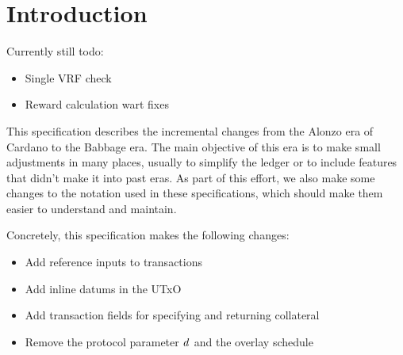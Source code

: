\section{Introduction}

Currently still todo:

\begin{itemize}
\item Single VRF check
\item Reward calculation wart fixes
\end{itemize}

This specification describes the incremental changes from the Alonzo
era of Cardano to the Babbage era. The main objective of this era is
to make small adjustments in many places, usually to simplify the
ledger or to include features that didn't make it into past eras. As
part of this effort, we also make some changes to the notation used in
these specifications, which should make them easier to understand and
maintain.

Concretely, this specification makes the following changes:
\begin{itemize}
\item Add reference inputs to transactions
\item Add inline datums in the UTxO
\item Add transaction fields for specifying and returning collateral
\item Remove the protocol parameter $\mathit{d}$ and the overlay schedule
\end{itemize}
